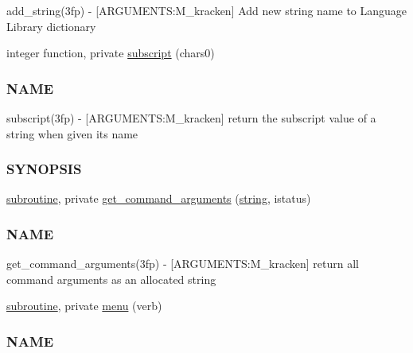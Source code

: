 \begin{DoxyCompactItemize}
\begin{DoxyCompactList}
add\+\_\+string(3fp) -\/ \mbox{[}A\+R\+G\+U\+M\+E\+N\+TS\+:M\+\_\+kracken\mbox{]} Add new string name to Language Library dictionary \end{DoxyCompactList}\item 
integer function, private \hyperlink{namespacem__kracken_a9e2129d174220802486cc2dc7e0cc443}{subscript} (chars0)
\begin{DoxyCompactList}\small\item\em \subsubsection*{N\+A\+ME}

subscript(3fp) -\/ \mbox{[}A\+R\+G\+U\+M\+E\+N\+TS\+:M\+\_\+kracken\mbox{]} return the subscript value of a string when given it\textquotesingle{}s name \subsubsection*{S\+Y\+N\+O\+P\+S\+IS}\end{DoxyCompactList}\item 
\hyperlink{M__stopwatch_83_8txt_acfbcff50169d691ff02d4a123ed70482}{subroutine}, private \hyperlink{namespacem__kracken_a4c509f8594be3b73928c43c961c1caf4}{get\+\_\+command\+\_\+arguments} (\hyperlink{what__overview_81_8txt_a74cb7e955273b9f9157b4f0c18a38849}{string}, istatus)
\begin{DoxyCompactList}\small\item\em \subsubsection*{N\+A\+ME}

get\+\_\+command\+\_\+arguments(3fp) -\/ \mbox{[}A\+R\+G\+U\+M\+E\+N\+TS\+:M\+\_\+kracken\mbox{]} return all command arguments as an allocated string \end{DoxyCompactList}\item 
\hyperlink{M__stopwatch_83_8txt_acfbcff50169d691ff02d4a123ed70482}{subroutine}, private \hyperlink{namespacem__kracken_ad0cfac1dcc02e0a67841f546cb57f823}{menu} (verb)
\begin{DoxyCompactList}\small\item\em \subsubsection*{N\+A\+ME}


\end{DoxyCompactList}
\end{DoxyCompactItemize}

